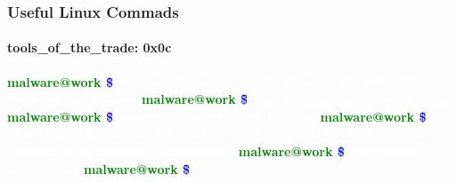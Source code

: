 \documentclass[aspectratio=169]{beamer}
\begin{document}
\begin{frame}
  \frametitle{Useful Linux Commads}
  \framesubtitle{tools\_of\_the\_trade: 0x0c}
  \begin{center}
    \begin{tcolorbox}[title=terminal,colback=black]
      \begin{minipage}{0.8\textwidth}
        \textbf{\textcolor{green}{malware@work \textcolor{blue}{\~ \$}}}
        \textcolor{white}{ file sample.bin}
        \newline
        \textcolor{white}{ sample.bin: PE32 executable (GUI) Intel 80386, for MS Windows}
        \newline
        \textbf{\textcolor{green}{malware@work \textcolor{blue}{\~ \$}}}
        \textcolor{white}{ exiftool sample.bin $>$ metadata.log}
        \newline
        \textbf{\textcolor{green}{malware@work \textcolor{blue}{\~ \$}}} \textcolor{white}{ hexdump -C -n 128 sample.bin $|$ less}
        \newline
        \textbf{\textcolor{green}{malware@work \textcolor{blue}{\~ \$}}}
        \textcolor{white}{ VBoxManage list vms}
        \newline
        \textcolor{white}{"win10" \{53014b4f-4c94-49b0-9036-818b84a192c9\}\newline"win7" \{942cde2e-6a84-4edc-b98a-d7326b4662ee\}}
        \newline
        \textbf{\textcolor{green}{malware@work \textcolor{blue}{\~ \$}}}
        \textcolor{white}{ VBoxManage startvm win7}
        \newline
        \textbf{\textcolor{green}{malware@work \textcolor{blue}{\~ \$}}}
      \end{minipage}
    \end{tcolorbox}
  \end{center}
\end{frame}
\end{document}

